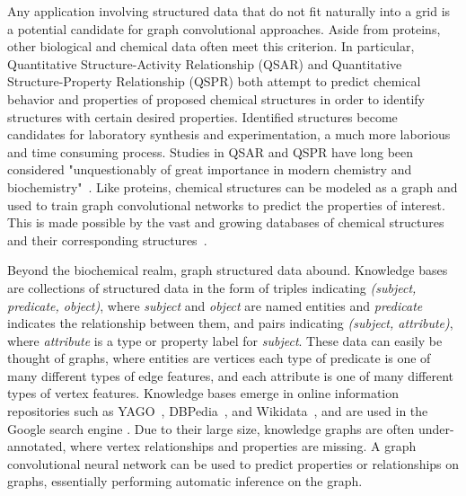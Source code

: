 Any application involving structured data that do not fit naturally into a grid is a potential candidate for graph convolutional approaches.
Aside from proteins, other biological and chemical data often meet this criterion.
In particular, Quantitative Structure-Activity Relationship (QSAR) and Quantitative Structure-Property Relationship (QSPR) both attempt to predict chemical behavior and properties of proposed chemical structures in order to identify structures with certain desired properties. 
Identified structures become candidates for laboratory synthesis and experimentation, a much more laborious and time consuming process. 
Studies in QSAR and QSPR have long been considered "unquestionably of great importance in modern chemistry and biochemistry"~\cite{karelson1996}.
Like proteins, chemical structures can be modeled as a graph and used to train graph convolutional networks to predict the properties of interest.
This is made possible by the vast and growing databases of chemical structures and their corresponding structures~\cite{olah2008, judson2008}.

Beyond the biochemical realm, graph structured data abound.
Knowledge bases are collections of structured data in the form of triples indicating \emph{(subject, predicate, object)}, where \emph{subject} and \emph{object} are named entities and \emph{predicate} indicates the relationship between them, and pairs indicating \emph{(subject, attribute)}, where \emph{attribute} is a type or property label for \emph{subject}.
These data can easily be thought of graphs, where entities are vertices each type of predicate is one of many different types of edge features, and each attribute is one of many different types of vertex features.
Knowledge bases emerge in online information repositories such as YAGO~\cite{mahdisoltani2014}, DBPedia~\cite{auer2007}, and Wikidata~\cite{vrandevcic2014}, and are used in the Google search engine \cite{singhal2012}.
Due to their large size, knowledge graphs are often under-annotated, where vertex relationships and properties are missing. 
A graph convolutional neural network can be used to predict properties or relationships on graphs, essentially performing automatic inference on the graph.



